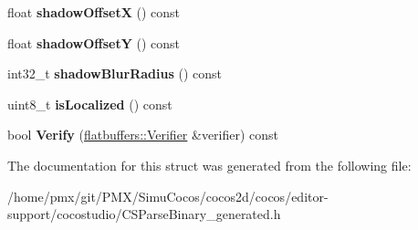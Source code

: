 \begin{DoxyCompactItemize}
float {\bfseries shadow\+OffsetX} () const
\item 
\mbox{\label{structflatbuffers_1_1TextOptions_a72999d04d43f478a8a3ea72db7036a0d}} 
float {\bfseries shadow\+OffsetY} () const
\item 
\mbox{\label{structflatbuffers_1_1TextOptions_a8500bd1d861d4013b3e301af5ed4e86b}} 
int32\+\_\+t {\bfseries shadow\+Blur\+Radius} () const
\item 
\mbox{\label{structflatbuffers_1_1TextOptions_a22ddf1327005ad67e1578f83da22c223}} 
uint8\+\_\+t {\bfseries is\+Localized} () const
\item 
\mbox{\label{structflatbuffers_1_1TextOptions_a436f868e410c21c59da36d3a63403ee2}} 
bool {\bfseries Verify} (\hyperlink{classflatbuffers_1_1Verifier}{flatbuffers\+::\+Verifier} \&verifier) const
\end{DoxyCompactItemize}


The documentation for this struct was generated from the following file\+:\begin{DoxyCompactItemize}
\item 
/home/pmx/git/\+P\+M\+X/\+Simu\+Cocos/cocos2d/cocos/editor-\/support/cocostudio/C\+S\+Parse\+Binary\+\_\+generated.\+h\end{DoxyCompactItemize}
